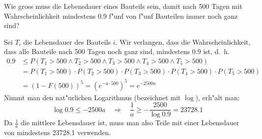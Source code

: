Wie gross muss die Lebensdauer eines Bauteils sein, damit nach 500
Tagen mit Wahrscheinlichkeit mindestens 0.9 f"unf von f"unf Bauteilen
immer noch ganz sind?

\begin{loesung}
Sei $T_i$ die Lebensdauer des Bauteils $i$. Wir verlangen, dass
die Wahrscheinlichkeit, dass alle Bauteile nach 500 Tagen noch
ganz sind, mindestens 0.9 ist, d.~h.
\begin{align*}
0.9
&\le
P(
T_1 > 500
\wedge
T_2 > 500
\wedge
T_3 > 500
\wedge
T_4 > 500
\wedge
T_5 > 500)
\\
&=
P(T_1 > 500)
\cdot
P(T_2 > 500)
\cdot
P(T_3 > 500)
\cdot
P(T_4 > 500)
\cdot
P(T_5 > 500)
\\
&=(1-F(500))^5=(e^{-a\cdot 500})^5=e^{-2500a}
\end{align*}
Nimmt man den nat"urlichen Logarithmus (bezeichnet mit $\log$),
erh"alt man:
\[
\log 0.9\le -2500 a\quad\Rightarrow\quad \frac1a \ge -\frac{2500}{\log 0.9}
=23728.1
\]
Da $\frac1a$ die mittlere Lebensdauer ist, muss man also Teile mit
einer Lebensdauer von mindestens 23728.1 verwenden.
\end{loesung}

